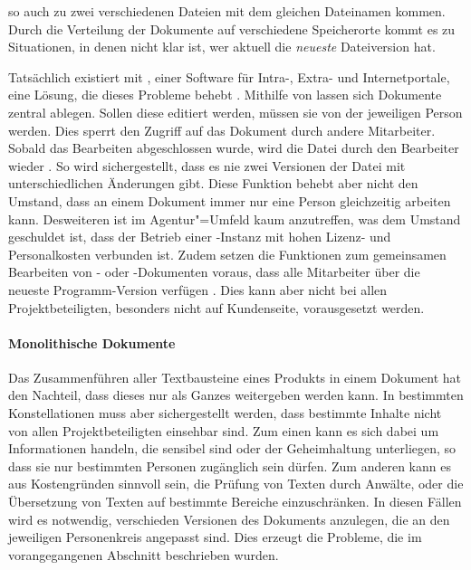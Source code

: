 so auch zu zwei verschiedenen Dateien mit dem gleichen Dateinamen kommen. Durch die Verteilung der Dokumente auf verschiedene Speicherorte kommt es zu Situationen, in denen nicht klar ist, wer aktuell die \emph{neueste} Dateiversion hat.

Tatsächlich existiert mit  , einer Software für Intra-, Extra- und Internetportale, eine Lösung, die dieses Probleme behebt \cite{sharepoint-shared-documents}. Mithilfe von  lassen sich Dokumente zentral ablegen. Sollen diese editiert werden, müssen sie von der jeweiligen Person  werden. Dies sperrt den Zugriff auf das Dokument durch andere Mitarbeiter. Sobald das Bearbeiten abgeschlossen wurde, wird die Datei durch den Bearbeiter wieder . So wird sichergestellt, dass es nie zwei Versionen der Datei mit unterschiedlichen Änderungen gibt. Diese Funktion behebt aber nicht den Umstand, dass an einem Dokument immer nur eine Person gleichzeitig arbeiten kann. Desweiteren ist  im Agentur"=Umfeld kaum anzutreffen, was dem Umstand geschuldet ist, dass der Betrieb einer -Instanz mit hohen Lizenz- und Personalkosten verbunden ist. Zudem setzen die Funktionen zum gemeinsamen Bearbeiten von - oder -Dokumenten voraus, dass alle Mitarbeiter über die neueste Programm-Version verfügen \cite{sharepoint-wordversions}. Dies kann aber nicht bei allen Projektbeteiligten, besonders nicht auf Kundenseite, vorausgesetzt werden.

\paragraph{Monolithische Dokumente} Das Zusammenführen aller Textbausteine eines Produkts in einem Dokument hat den Nachteil, dass dieses nur als Ganzes weitergeben werden kann. In bestimmten Konstellationen muss aber sichergestellt werden, dass bestimmte Inhalte nicht von allen Projektbeteiligten einsehbar sind. Zum einen kann es sich dabei um Informationen handeln, die sensibel sind oder der Geheimhaltung unterliegen, so dass sie nur bestimmten Personen zugänglich sein dürfen. Zum anderen kann es aus Kostengründen sinnvoll sein, die Prüfung von Texten durch Anwälte, oder die Übersetzung von Texten auf bestimmte Bereiche einzuschränken. In diesen Fällen wird es notwendig, verschieden Versionen des Dokuments anzulegen, die an den jeweiligen Personenkreis angepasst sind. Dies erzeugt die Probleme, die im vorangegangenen Abschnitt beschrieben wurden.

